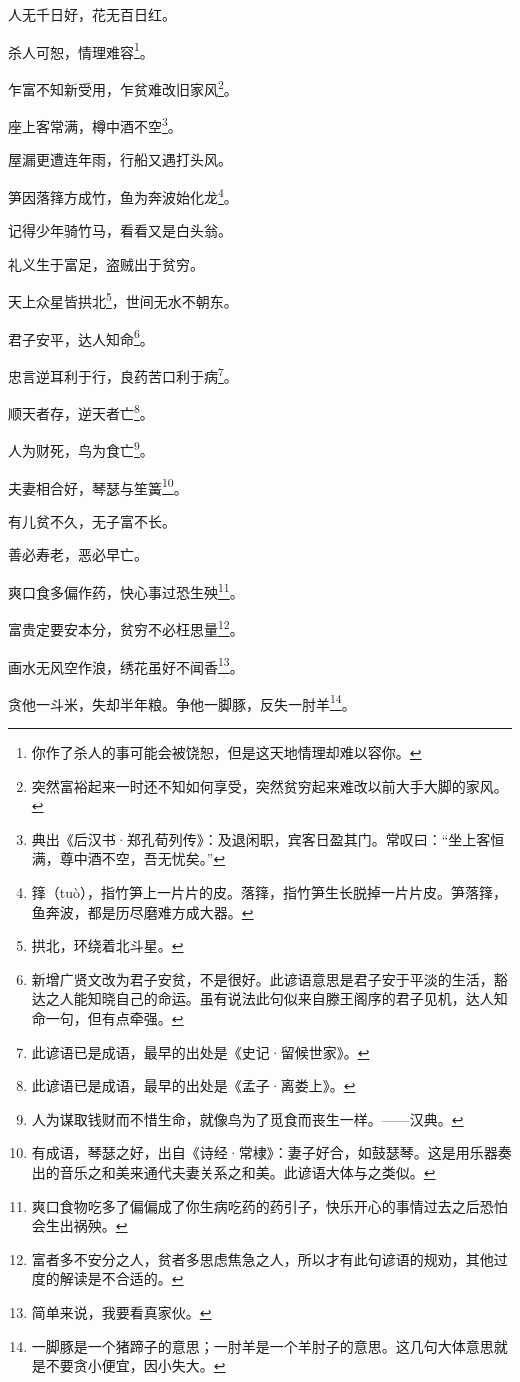 \documentclass[12pt,oneside]{book}
\begin{document}
人无千日好，花无百日红。

杀人可恕，情理难容\footnote{你作了杀人的事可能会被饶恕，但是这天地情理却难以容你。}。

乍富不知新受用，乍贫难改旧家风\footnote{突然富裕起来一时还不知如何享受，突然贫穷起来难改以前大手大脚的家风。}。

座上客常满，樽中酒不空\footnote{典出《后汉书·郑孔荀列传》：及退闲职，宾客日盈其门。常叹曰：“坐上客恒满，尊中酒不空，吾无忧矣。”}。

屋漏更遭连年雨，行船又遇打头风。

笋因落箨方成竹，鱼为奔波始化龙\footnote{箨（tuò），指竹笋上一片片的皮。落箨，指竹笋生长脱掉一片片皮。笋落箨，鱼奔波，都是历尽磨难方成大器。}。

记得少年骑竹马，看看又是白头翁。

礼义生于富足，盗贼出于贫穷。

天上众星皆拱北\footnote{拱北，环绕着北斗星。}，世间无水不朝东。

君子安平，达人知命\footnote{新增广贤文改为君子安贫，不是很好。此谚语意思是君子安于平淡的生活，豁达之人能知晓自己的命运。虽有说法此句似来自滕王阁序的君子见机，达人知命一句，但有点牵强。}。

忠言逆耳利于行，良药苦口利于病\footnote{此谚语已是成语，最早的出处是《史记·留候世家》。}。

顺天者存，逆天者亡\footnote{此谚语已是成语，最早的出处是《孟子·离娄上》。}。

人为财死，鸟为食亡\footnote{人为谋取钱财而不惜生命，就像鸟为了觅食而丧生一样。——汉典。}。

夫妻相合好，琴瑟与笙簧\footnote{有成语，琴瑟之好，出自《诗经·常棣》：妻子好合，如鼓瑟琴。这是用乐器奏出的音乐之和美来通代夫妻关系之和美。此谚语大体与之类似。}。

有儿贫不久，无子富不长。

善必寿老，恶必早亡。

爽口食多偏作药，快心事过恐生殃\footnote{爽口食物吃多了偏偏成了你生病吃药的药引子，快乐开心的事情过去之后恐怕会生出祸殃。}。

富贵定要安本分，贫穷不必枉思量\footnote{富者多不安分之人，贫者多思虑焦急之人，所以才有此句谚语的规劝，其他过度的解读是不合适的。}。

画水无风空作浪，绣花虽好不闻香\footnote{简单来说，我要看真家伙。}。

贪他一斗米，失却半年粮。争他一脚豚，反失一肘羊\footnote{一脚豚是一个猪蹄子的意思；一肘羊是一个羊肘子的意思。这几句大体意思就是不要贪小便宜，因小失大。}。
\end{document}
